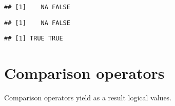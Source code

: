 \documentclass[paper=a4,10pt,div=17,headsepline,BCOR=12mm,twoside,open=right]{scrbook}\usepackage{knitr}
\begin{document}
\begin{knitrout}\footnotesize
{}\color{fgcolor}\begin{kframe}
\begin{alltt}
 \hlopt{&}  \hlopt{&} 
\end{alltt}
\begin{verbatim}
## [1]    NA FALSE
\end{verbatim}
\begin{alltt}
 \hlopt{&}  \hlopt{&} \hlstd{(}\hlstd{,} \hlstd{)}
\end{alltt}
\begin{verbatim}
## [1]    NA FALSE
\end{verbatim}
\begin{alltt}
 \hlopt{|}  \hlopt{|} \hlstd{(}\hlstd{,} \hlstd{)}
\end{alltt}
\begin{verbatim}
## [1] TRUE TRUE
\end{verbatim}
\end{kframe}
\end{knitrout}


\section{Comparison operators}

Comparison operators yield as a result logical values.
\end{document}
